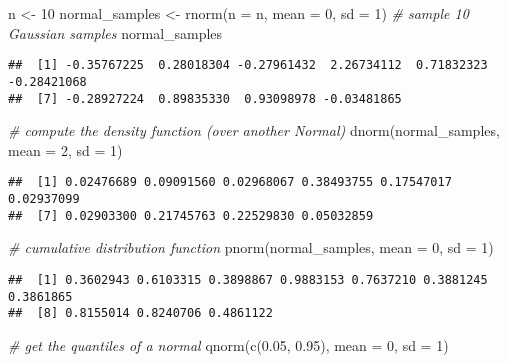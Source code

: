 \documentclass[
  oneside]{book}
\newenvironment{Shaded}{\begin{snugshade}}{\end{snugshade}}
\newcommand{\AttributeTok}[1]{\textcolor[rgb]{0.77,0.63,0.00}{#1}}
\newcommand{\CommentTok}[1]{\textcolor[rgb]{0.56,0.35,0.01}{\textit{#1}}}
\newcommand{\DecValTok}[1]{\textcolor[rgb]{0.00,0.00,0.81}{#1}}
\newcommand{\FloatTok}[1]{\textcolor[rgb]{0.00,0.00,0.81}{#1}}
\newcommand{\FunctionTok}[1]{\textcolor[rgb]{0.00,0.00,0.00}{#1}}
\newcommand{\NormalTok}[1]{#1}
\newcommand{\OtherTok}[1]{\textcolor[rgb]{0.56,0.35,0.01}{#1}}
\begin{document}
\begin{Shaded}
\begin{Highlighting}[]
\NormalTok{n }\OtherTok{\textless{}{-}} \DecValTok{10}
\NormalTok{normal\_samples }\OtherTok{\textless{}{-}} \FunctionTok{rnorm}\NormalTok{(}\AttributeTok{n =}\NormalTok{ n, }\AttributeTok{mean =} \DecValTok{0}\NormalTok{, }\AttributeTok{sd =} \DecValTok{1}\NormalTok{) }\CommentTok{\# sample 10 Gaussian samples}
\NormalTok{normal\_samples}
\end{Highlighting}
\end{Shaded}

\begin{verbatim}
##  [1] -0.35767225  0.28018304 -0.27961432  2.26734112  0.71832323 -0.28421068
##  [7] -0.28927224  0.89835330  0.93098978 -0.03481865
\end{verbatim}

\begin{Shaded}
\begin{Highlighting}[]
\CommentTok{\# compute the density function (over another Normal)}
\FunctionTok{dnorm}\NormalTok{(normal\_samples, }\AttributeTok{mean =} \DecValTok{2}\NormalTok{, }\AttributeTok{sd =} \DecValTok{1}\NormalTok{)}
\end{Highlighting}
\end{Shaded}

\begin{verbatim}
##  [1] 0.02476689 0.09091560 0.02968067 0.38493755 0.17547017 0.02937099
##  [7] 0.02903300 0.21745763 0.22529830 0.05032859
\end{verbatim}

\begin{Shaded}
\begin{Highlighting}[]
\CommentTok{\# cumulative distribution function}
\FunctionTok{pnorm}\NormalTok{(normal\_samples, }\AttributeTok{mean =} \DecValTok{0}\NormalTok{, }\AttributeTok{sd =} \DecValTok{1}\NormalTok{)}
\end{Highlighting}
\end{Shaded}

\begin{verbatim}
##  [1] 0.3602943 0.6103315 0.3898867 0.9883153 0.7637210 0.3881245 0.3861865
##  [8] 0.8155014 0.8240706 0.4861122
\end{verbatim}

\begin{Shaded}
\begin{Highlighting}[]
\CommentTok{\# get the quantiles of a normal}
\FunctionTok{qnorm}\NormalTok{(}\FunctionTok{c}\NormalTok{(}\FloatTok{0.05}\NormalTok{, }\FloatTok{0.95}\NormalTok{), }\AttributeTok{mean =} \DecValTok{0}\NormalTok{, }\AttributeTok{sd =} \DecValTok{1}\NormalTok{)}
\end{Highlighting}
\end{Shaded}
\end{document}
